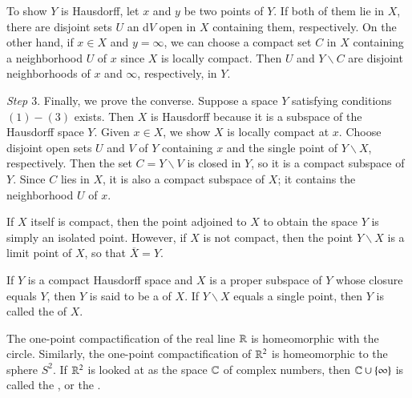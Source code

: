 \documentclass[12pt, a4paper, twoside, openright, titlepage]{book}
\begin{document}
\begin{proof*}{}{}
    To show $Y$ is Hausdorff, let $x$ and $y$ be two points of $Y$. If both of them lie in $X$, there are disjoint sets $U$ an d$V$ open in $X$ containing them, respectively. On the other hand, if $x \in X$ and $y = \infty$, we can choose a compact set $C$ in $X$ containing a neighborhood $U$ of $x$ since $X$ is locally compact. Then $U$ and $Y\backslash C$ are disjoint neighborhoods of $x$ and $\infty$, respectively, in $Y$.

    \emph{Step $3.$} Finally, we prove the converse. Suppose a space $Y$ satisfying conditions $(1)-(3)$ exists. Then $X$ is Hausdorff because it is a subspace of the Hausdorff space $Y$. Given $x \in X$, we show $X$ is locally compact at $x$. Choose disjoint open sets $U$ and $V$ of $Y$ containing $x$ and the single point of $Y\backslash X$, respectively. Then the set $C = Y\backslash V$ is closed in $Y$, so it is a compact subspace of $Y$. Since $C$ lies in $X$, it is also a compact subspace of $X$; it contains the neighborhood $U$ of $x$.
\end{proof*}

If $X$ itself is compact, then the point adjoined to $X$ to obtain the space $Y$ is simply an isolated point. However, if $X$ is not compact, then the point $Y\backslash X$ is a limit point of $X$, so that $\overline{X} = Y$.


\begin{defn}{}{}
    If $Y$ is a compact Hausdorff space and $X$ is a proper subspace of $Y$ whose closure equals $Y$, then $Y$ is said to be a  of $X$. If $Y\backslash X$ equals a single point, then $Y$ is called the  of $X$.
\end{defn}

\begin{eg}{}{}
    The one-point compactification of the real line $\mathbb R$ is homeomorphic with the circle. Similarly, the one-point compactification of $\mathbb R^2$ is homeomorphic to the sphere $S^2$. If $\mathbb R^2$ is looked at as the space $\mathbb C$ of complex numbers, then $\mathbb C\cup\{\infty\}$ is called the , or the .
\end{eg}
\end{document}
